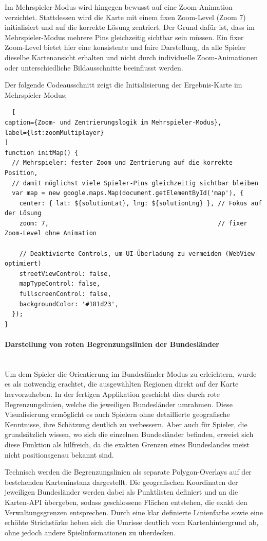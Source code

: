 Im Mehrspieler-Modus wird hingegen bewusst auf eine Zoom-Animation verzichtet. Stattdessen wird die Karte mit einem fixen Zoom-Level (Zoom 7) initialisiert und auf die korrekte Lösung zentriert. Der Grund dafür ist, dass im Mehrspieler-Modus mehrere Pins gleichzeitig sichtbar sein müssen. Ein fixer Zoom-Level bietet hier eine konsistente und faire Darstellung, da alle Spieler dieselbe Kartenansicht erhalten und nicht durch individuelle Zoom-Animationen oder unterschiedliche Bildausschnitte beeinflusst werden.

Der folgende Codeausschnitt zeigt die Initialisierung der Ergebnis-Karte im Mehrspieler-Modus:

\begin{lstlisting}
  [
caption={Zoom- und Zentrierungslogik im Mehrspieler-Modus},
label={lst:zoomMultiplayer}
] 
function initMap() {
  // Mehrspieler: fester Zoom und Zentrierung auf die korrekte Position,
  // damit möglichst viele Spieler-Pins gleichzeitig sichtbar bleiben
  var map = new google.maps.Map(document.getElementById('map'), {
    center: { lat: ${solutionLat}, lng: ${solutionLng} }, // Fokus auf der Lösung
    zoom: 7,                                              // fixer Zoom-Level ohne Animation

    // Deaktivierte Controls, um UI-Überladung zu vermeiden (WebView-optimiert)
    streetViewControl: false,
    mapTypeControl: false,
    fullscreenControl: false,
    backgroundColor: '#181d23',
  });
}
\end{lstlisting}

\paragraph{Darstellung von roten Begrenzungslinien der Bundesländer}
\mbox{}\\
Um dem Spieler die Orientierung im Bundesländer-Modus zu erleichtern, wurde es als notwendig erachtet, die ausgewählten Regionen direkt auf der Karte hervorzuheben. In der fertigen Applikation geschieht dies durch rote Begrenzungslinien, welche die jeweiligen Bundesländer umrahmen. Diese Visualisierung ermöglicht es auch Spielern ohne detaillierte geografische Kenntnisse, ihre Schätzung deutlich zu verbessern. Aber auch für Spieler, die grundsätzlich wissen, wo sich die einzelnen Bundesländer befinden, erweist sich diese Funktion als hilfreich, da die exakten Grenzen eines Bundeslandes meist nicht positionsgenau bekannt sind. 

Technisch werden die Begrenzungslinien als separate Polygon-Overlays auf der bestehenden Karteninstanz dargestellt. Die geografischen Koordinaten der jeweiligen Bundesländer werden dabei als Punktlisten definiert und an die Karten-API übergeben, sodass geschlossene Flächen entstehen, die exakt den Verwaltungsgrenzen entsprechen. Durch eine klar definierte Linienfarbe sowie eine erhöhte Strichstärke heben sich die Umrisse deutlich vom Kartenhintergrund ab, ohne jedoch andere Spielinformationen zu überdecken.


